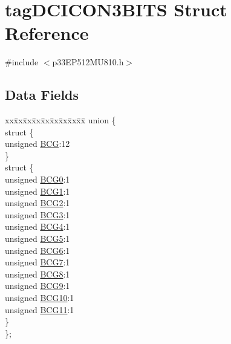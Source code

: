 \hypertarget{structtag_d_c_i_c_o_n3_b_i_t_s}{}\section{tag\+D\+C\+I\+C\+O\+N3\+B\+I\+TS Struct Reference}
\label{structtag_d_c_i_c_o_n3_b_i_t_s}


{\ttfamily \#include $<$p33\+E\+P512\+M\+U810.\+h$>$}

\subsection*{Data Fields}
\begin{DoxyCompactItemize}
\item 
\begin{tabbing}
xx\=xx\=xx\=xx\=xx\=xx\=xx\=xx\=xx\=\kill
union \{\\
\>struct \{\\
\>\>unsigned \hyperlink{structtag_d_c_i_c_o_n3_b_i_t_s_af0c23fc807a7fbc12f68ba28c454f5b2}{BCG}:12\\
\>\} \\
\>struct \{\\
\>\>unsigned \hyperlink{structtag_d_c_i_c_o_n3_b_i_t_s_a25e5451ecb482b985c5f7b49ed7c5766}{BCG0}:1\\
\>\>unsigned \hyperlink{structtag_d_c_i_c_o_n3_b_i_t_s_a834cab0fca9a3de79af83bbbff4120df}{BCG1}:1\\
\>\>unsigned \hyperlink{structtag_d_c_i_c_o_n3_b_i_t_s_a785b195fef22834f4d5cf67d89c2060e}{BCG2}:1\\
\>\>unsigned \hyperlink{structtag_d_c_i_c_o_n3_b_i_t_s_ad5b1925909005b382e59a598e388dd05}{BCG3}:1\\
\>\>unsigned \hyperlink{structtag_d_c_i_c_o_n3_b_i_t_s_ae21fc903c04d6d52cd87777aca970cb7}{BCG4}:1\\
\>\>unsigned \hyperlink{structtag_d_c_i_c_o_n3_b_i_t_s_adfec8044cceca4114dc400a21a5f7008}{BCG5}:1\\
\>\>unsigned \hyperlink{structtag_d_c_i_c_o_n3_b_i_t_s_ab01b9b2a6a21a466aaa7aa9523f23ba7}{BCG6}:1\\
\>\>unsigned \hyperlink{structtag_d_c_i_c_o_n3_b_i_t_s_a76552cb4c974bcc578d8b334cef0a7a6}{BCG7}:1\\
\>\>unsigned \hyperlink{structtag_d_c_i_c_o_n3_b_i_t_s_a92116043f0d6f8a7eb1a591e5afd6191}{BCG8}:1\\
\>\>unsigned \hyperlink{structtag_d_c_i_c_o_n3_b_i_t_s_ab32763fdafe3f3afb6abf23bab9c19db}{BCG9}:1\\
\>\>unsigned \hyperlink{structtag_d_c_i_c_o_n3_b_i_t_s_aebb63768662a99ad310ed9b05e11cfbc}{BCG10}:1\\
\>\>unsigned \hyperlink{structtag_d_c_i_c_o_n3_b_i_t_s_a175f2d49ba274936bc464ad2986bff52}{BCG11}:1\\
\>\} \\
\}; \\

\end{tabbing}\end{DoxyCompactItemize}


